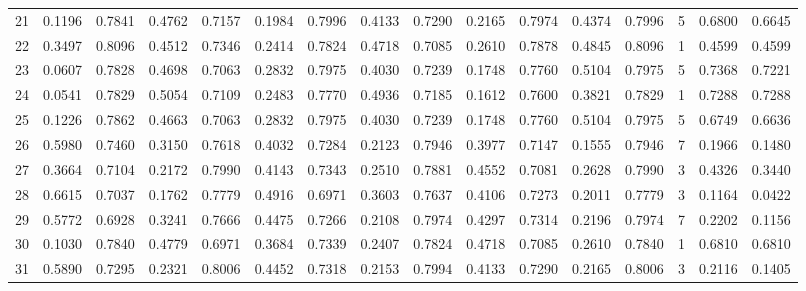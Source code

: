 \begin{tabular}{lrrrrrrrrrrrrrrr}
21  &      0.1196 &  0.7841 &  0.4762 &  0.7157 &  0.1984 &  0.7996 &  0.4133 &  0.7290 &  0.2165 &  0.7974 &   0.4374 &     0.7996 &      5 &                    0.6800 &                     0.6645 \\
22  &      0.3497 &  0.8096 &  0.4512 &  0.7346 &  0.2414 &  0.7824 &  0.4718 &  0.7085 &  0.2610 &  0.7878 &   0.4845 &     0.8096 &      1 &                    0.4599 &                     0.4599 \\
23  &      0.0607 &  0.7828 &  0.4698 &  0.7063 &  0.2832 &  0.7975 &  0.4030 &  0.7239 &  0.1748 &  0.7760 &   0.5104 &     0.7975 &      5 &                    0.7368 &                     0.7221 \\
24  &      0.0541 &  0.7829 &  0.5054 &  0.7109 &  0.2483 &  0.7770 &  0.4936 &  0.7185 &  0.1612 &  0.7600 &   0.3821 &     0.7829 &      1 &                    0.7288 &                     0.7288 \\
25  &      0.1226 &  0.7862 &  0.4663 &  0.7063 &  0.2832 &  0.7975 &  0.4030 &  0.7239 &  0.1748 &  0.7760 &   0.5104 &     0.7975 &      5 &                    0.6749 &                     0.6636 \\
26  &      0.5980 &  0.7460 &  0.3150 &  0.7618 &  0.4032 &  0.7284 &  0.2123 &  0.7946 &  0.3977 &  0.7147 &   0.1555 &     0.7946 &      7 &                    0.1966 &                     0.1480 \\
27  &      0.3664 &  0.7104 &  0.2172 &  0.7990 &  0.4143 &  0.7343 &  0.2510 &  0.7881 &  0.4552 &  0.7081 &   0.2628 &     0.7990 &      3 &                    0.4326 &                     0.3440 \\
28  &      0.6615 &  0.7037 &  0.1762 &  0.7779 &  0.4916 &  0.6971 &  0.3603 &  0.7637 &  0.4106 &  0.7273 &   0.2011 &     0.7779 &      3 &                    0.1164 &                     0.0422 \\
29  &      0.5772 &  0.6928 &  0.3241 &  0.7666 &  0.4475 &  0.7266 &  0.2108 &  0.7974 &  0.4297 &  0.7314 &   0.2196 &     0.7974 &      7 &                    0.2202 &                     0.1156 \\
30  &      0.1030 &  0.7840 &  0.4779 &  0.6971 &  0.3684 &  0.7339 &  0.2407 &  0.7824 &  0.4718 &  0.7085 &   0.2610 &     0.7840 &      1 &                    0.6810 &                     0.6810 \\
31  &      0.5890 &  0.7295 &  0.2321 &  0.8006 &  0.4452 &  0.7318 &  0.2153 &  0.7994 &  0.4133 &  0.7290 &   0.2165 &     0.8006 &      3 &                    0.2116 &                     0.1405 \\

\end{tabular}
